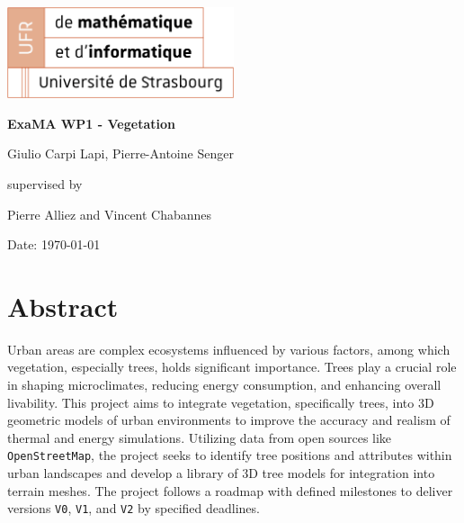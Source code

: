\documentclass[12pt]{article}
\begin{document}
\begin{titlepage}
\centering
\includegraphics[width=0.5\textwidth]{images/logo_ufr.png}\par\vspace{1cm}
\vspace{1.5cm}
{\huge\bfseries ExaMA WP1 - Vegetation\par}
\vspace{2cm}
{\Large Giulio Carpi Lapi, Pierre-Antoine Senger\par}
\vfill
supervised by\par
Pierre Alliez and Vincent Chabannes

\vfill

{\large Date: \today\par}
\end{titlepage}

\tableofcontents
\newpage

\section{Abstract}
Urban areas are complex ecosystems influenced by various factors, among which 
vegetation, especially trees, holds significant importance. Trees play a crucial 
role in shaping microclimates, reducing energy consumption, and enhancing overall 
livability\cite{TIR4sTREEt}. This project aims to integrate vegetation, specifically trees, into 3D 
geometric models of urban environments to improve the accuracy and realism of thermal 
and energy simulations. Utilizing data from open sources like \texttt{OpenStreetMap},
the project seeks to identify tree positions and attributes within urban landscapes and develop 
a library of 3D tree models for integration into terrain meshes. The project follows
a roadmap with defined milestones to deliver versions \texttt{V0}, \texttt{V1},
and \texttt{V2} by specified  deadlines.
\end{document}
